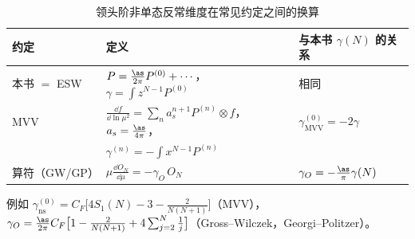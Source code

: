 \begin{table}[htbp]
\centering
\caption{领头阶非单态反常维度在常见约定之间的换算}\label{tab:cpdf-conv}
\begin{tabular}{@{}lll@{}}
\toprule
约定 & 定义 & 与本书 $\gamma(N)$ 的关系\\
\midrule
本书 $=$ ESW & $P=\frac{\as}{2\pi}P^{(0)}+\cdots$，$\gamma=\int z^{N-1}P^{(0)}$ & 相同\\
MVV & $\frac{\dd f}{\dd\ln\mu^2}=\sum_n a_s^{n+1}P^{(n)}\otimes f$，$a_s=\frac{\as}{4\pi}$， & $\gamma^{(0)}_{\mathrm{MVV}}=-2\gamma$\\
    & $\gamma^{(n)}=-\int x^{N-1}P^{(n)}$ & \\
算符（GW/GP） & $\mu\frac{\dd O_N}{\dd\mu}=-\gamma_O\,O_N$ & $\gamma_O=-\frac{\as}{\pi}\gamma(N)$\\
\bottomrule
\end{tabular}
\end{table}
例如 $\gamma^{(0)}_{\mathrm{ns}}=C_F\big[4S_1(N)-3-\frac{2}{N(N+1)}\big]$（MVV），
$\gamma_O=\frac{\as}{2\pi}C_F\big[1-\frac{2}{N(N+1)}+4\sum_{j=2}^N\frac1j\big]$（Gross--Wilczek，Georgi--Politzer）。
